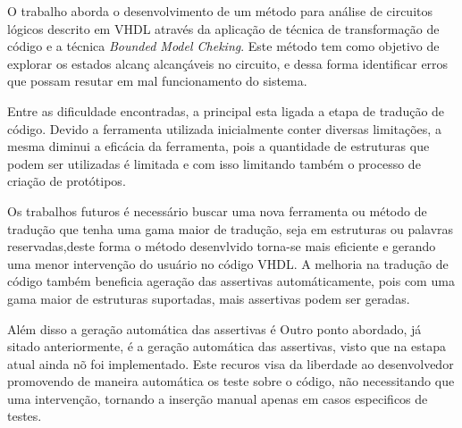 \label{chapter:consideracoes}
O trabalho aborda o desenvolvimento de um método para análise de circuitos lógicos descrito em VHDL através da aplicação de técnica de transformação de código e a técnica \textit{Bounded Model Cheking}. Este método tem como objetivo de explorar os estados alcanç alcançáveis no circuito, e dessa forma identificar erros que possam resutar em mal funcionamento do sistema.


\par
Entre as dificuldade encontradas, a principal esta ligada a etapa de tradução de código. Devido a ferramenta utilizada inicialmente conter diversas limitações, a mesma diminui a eficácia da ferramenta, pois a quantidade de estruturas que podem ser utilizadas é limitada e com isso limitando também o processo de criação de protótipos.

\par
Os trabalhos futuros é necessário buscar uma nova ferramenta ou método de tradução que tenha uma gama maior de tradução, seja em estruturas ou palavras reservadas,deste forma o método desenvlvido torna-se mais eficiente e gerando uma menor intervenção do usuário no código VHDL. A melhoria na tradução de código também beneficia ageração das assertivas automáticamente, pois com uma gama maior de estruturas suportadas, mais assertivas podem ser geradas.

\par
Além disso a geração automática das assertivas é Outro ponto abordado, já sitado anteriormente, é a geração automática das assertivas, visto que na estapa atual ainda nõ foi implementado. Este recuros visa da liberdade ao desenvolvedor promovendo de maneira automática os teste sobre o código, não necessitando que uma intervenção, tornando a inserção manual apenas em casos especificos de testes.
 
